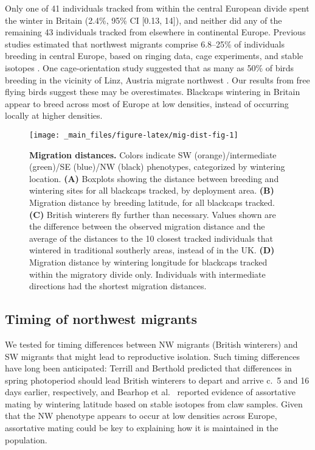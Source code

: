 \documentclass[a4paper, nobind]{templates/ociamthesis}
\begin{document}
Only one of 41 individuals tracked from within the central European divide spent the winter in Britain (2.4\%, 95\% CI {[}0.13, 14{]}), and neither did any of the remaining 43 individuals tracked from elsewhere in continental Europe.
Previous studies estimated that northwest migrants comprise 6.8--25\% of individuals breeding in central Europe, based on ringing data, cage experiments, and stable isotopes \autocite{helbigPopulationDifferentiationMigratory1992,helbigSESWmigratingBlackcap1991,rolshausenContemporaryEvolutionReproductive2009,rolshausenSpringArrivalMigratory2010}.
One cage-orientation study suggested that as many as 50\% of birds breeding in the vicinity of Linz, Austria migrate northwest \autocite{helbigSESWmigratingBlackcap1991}.
Our results from free flying birds suggest these may be overestimates. Blackcaps wintering in Britain appear to breed across most of Europe at low densities, instead of occurring locally at higher densities.



\begin{figure}
\texttt{[image: \_main\_files/figure-latex/mig-dist-fig-1]} \caption{\textbf{Migration distances.} Colors indicate SW (orange)/intermediate (green)/SE (blue)/NW (black) phenotypes, categorized by wintering location. \textbf{(A)} Boxplots showing the distance between breeding and wintering sites for all blackcaps tracked, by deployment area. \textbf{(B)} Migration distance by breeding latitude, for all blackcaps tracked. \textbf{(C)} British winterers fly further than necessary. Values shown are the difference between the observed migration distance and the average of the distances to the 10 closest tracked individuals that wintered in traditional southerly areas, instead of in the UK. \textbf{(D)} Migration distance by wintering longitude for blackcaps tracked within the migratory divide only. Individuals with intermediate directions had the shortest migration distances.}\label{fig:mig-dist-fig}
\end{figure}

\hypertarget{timing-of-northwest-migrants}{%
\subsection{Timing of northwest migrants}\label{timing-of-northwest-migrants}}

We tested for timing differences between NW migrants (British winterers) and SW migrants that might lead to reproductive isolation.
Such timing differences have long been anticipated: Terrill and Berthold \autocite*{terrillEcophysiologicalAspectsRapid1990} predicted that differences in spring photoperiod should lead British winterers to depart and arrive c.~5 and 16 days earlier, respectively, and Bearhop et al.~\autocite*{bearhopAssortativeMatingMechanism2005} reported evidence of assortative mating by wintering latitude based on stable isotopes from claw samples.
Given that the NW phenotype appears to occur at low densities across Europe, assortative mating could be key to explaining how it is maintained in the population.
\end{document}
